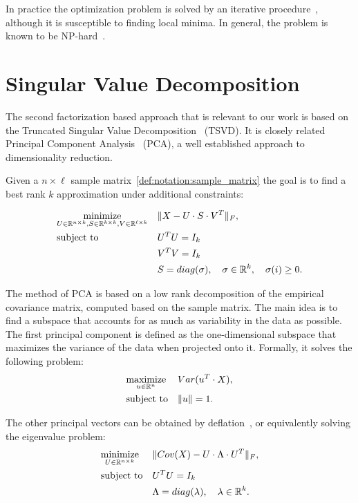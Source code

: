 In practice the optimization problem is solved by an iterative procedure~\cite{kmeans}, although it is susceptible to finding local minima. In
general, the problem is known to be NP-hard~\cite{aloise2009np}.

\section{Singular Value Decomposition}\label{chap:background:svd}

The second factorization based approach that is relevant to our work is based on the Truncated Singular Value Decomposition~\cite{golub} (TSVD). It is closely
related Principal Component Analysis~\cite{Pearson1901On} (PCA), a well established approach to dimensionality reduction.

Given a $n \times \ell$ sample matrix~\ref{def:notation:sample_matrix}
the goal is to find a best rank $k$ approximation under additional constraints:

\begin{equation}\label{eq:background:svd:opt}
\begin{aligned}
& \underset{U \in \mathbb{R}^{n \times k}, S \in \mathbb{R}^{k \times k}, V \in \mathbb{R}^{\ell \times k}}{\text{minimize}}
& & \lVert X - U \cdot S \cdot V^T\rVert_F, \\
& \text{subject to}
& & U^TU = I_k \\
& & & V^TV = I_k \\
& & & S = diag(\sigma), \quad \sigma \in \mathbb{R}^k, \quad \sigma(i) \geq 0.
\end{aligned}
\end{equation}

The method of PCA is based on a low rank decomposition of the empirical covariance matrix, computed based on the sample matrix. The main
idea is to find a subspace that accounts for as much as variability in the data as possible. The first principal component is defined
as the one-dimensional subspace that maximizes the variance of the data when projected onto it. Formally, it solves the following problem:
\begin{equation}\label{eq:background:pca:single}
\begin{aligned}
& \underset{u \in \mathbb{R}^{n}}{\text{maximize}}
& & Var(u^T \cdot X), \\
& \text{subject to}
& & \lVert u\rVert = 1.
\end{aligned}
\end{equation}


The other principal vectors can be obtained by deflation~\cite{shawe-taylor04kernel}, or equivalently solving the eigenvalue problem:
\begin{equation}\label{eq:background:pca:opt}
\begin{aligned}
& \underset{U \in \mathbb{R}^{n \times k}}{\text{minimize}}
& & \lVert Cov(X) - U \cdot \Lambda \cdot U^T\rVert_F, \\
& \text{subject to}
& & U^TU = I_k \\
& & & \Lambda = diag(\lambda), \quad \lambda \in \mathbb{R}^k.
\end{aligned}
\end{equation}

